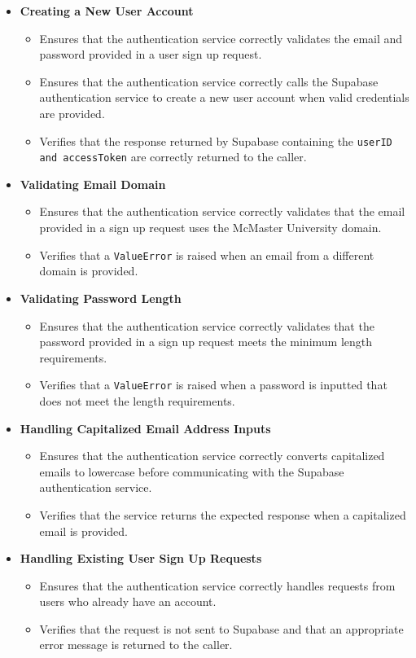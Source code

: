 \documentclass[12pt, titlepage]{article}
\begin{document}
\begin{itemize}
  \item \textbf{Creating a New User Account}
  \begin{itemize}
    \item Ensures that the authentication service correctly validates the email and password provided in a user sign up request.
    \item Ensures that the authentication service correctly calls the Supabase authentication service to create a new user account when valid credentials are provided.
    \item Verifies that the response returned by Supabase containing the \texttt{userID and accessToken} are correctly returned to the caller.
  \end{itemize}

  \item \textbf{Validating Email Domain}
  \begin{itemize}
    \item Ensures that the authentication service correctly validates that the email provided in a sign up request uses the McMaster University domain.
    \item Verifies that a \texttt{ValueError} is raised when an email from a different domain is provided.  
  \end{itemize}

  \item \textbf{Validating Password Length}
  \begin{itemize}
    \item Ensures that the authentication service correctly validates that the password provided in a sign up request meets the minimum length requirements.
    \item Verifies that a \texttt{ValueError} is raised when a password is inputted that does not meet the length requirements.
  \end{itemize}

  \item \textbf{Handling Capitalized Email Address Inputs}
  \begin{itemize}
    \item Ensures that the authentication service correctly converts capitalized emails to lowercase before communicating with the Supabase authentication service.
    \item Verifies that the service returns the expected response when a capitalized email is provided.
  \end{itemize}

  \item \textbf{Handling Existing User Sign Up Requests}
  \begin{itemize} 
    \item Ensures that the authentication service correctly handles requests from users who already have an account.
    \item Verifies that the request is not sent to Supabase and that an appropriate error message is returned to the caller. 
\end{itemize}
\end{itemize}
\end{document}
